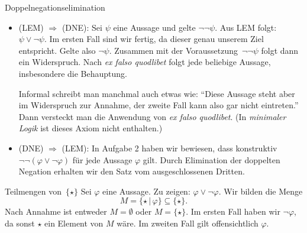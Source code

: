 \documentclass{pizzablatt}
\begin{document}
\pagebreak

\begin{aufgabe}{Doppelnegationselimination}
\begin{itemize}
  \item (LEM) $\Rightarrow$ (DNE): Sei $\psi$ eine Aussage und gelte $\neg\neg\psi$. Aus LEM folgt: $\psi \vee \neg\psi$. Im ersten Fall sind wir fertig, da dieser genau unserem Ziel entspricht. Gelte also $\neg\psi$. Zusammen mit der Voraussetzung~$\neg\neg\psi$ folgt dann ein Widerspruch. Nach \emph{ex falso quodlibet} folgt jede beliebige Aussage, insbesondere die Behauptung.
  
Informal schreibt man manchmal auch etwas wie: "`Diese Aussage steht aber im Widerspruch zur Annahme, der zweite Fall kann also gar nicht eintreten."' Dann versteckt man die Anwendung von \emph{ex falso quodlibet}. (In \emph{minimaler Logik} ist dieses Axiom nicht enthalten.)

  \item (DNE) $\Rightarrow$ (LEM): In Aufgabe 2 haben wir bewiesen, dass konstruktiv $\neg\neg(\varphi \vee \neg\varphi)$ für jede Aussage $\varphi$ gilt. Durch Elimination der doppelten Negation erhalten wir den Satz vom ausgeschlossenen Dritten.
\end{itemize}

\end{aufgabe}

\begin{aufgabe}{Teilmengen von~$\{\star\}$}
Sei $\varphi$ eine Aussage. Zu zeigen: $\varphi \vee \neg\varphi$. Wir bilden die Menge
\[ M = \{ \star \,|\, \varphi \} \subseteq \{\star\}. \]
Nach Annahme ist entweder $M = \emptyset$ oder $M = \{\star\}$. Im ersten Fall haben wir $\neg\varphi$, da sonst $\star$ ein Element von $M$ wäre. Im zweiten Fall gilt offensichtlich $\varphi$.
\end{aufgabe}
\end{document}
